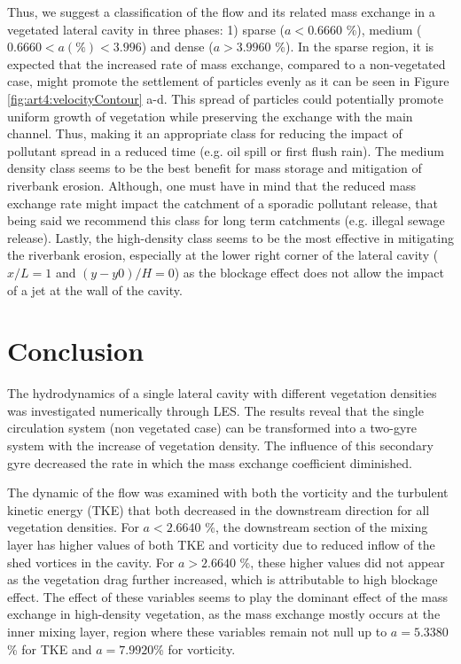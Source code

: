 Thus, we suggest a classification of the flow and its related mass exchange in a vegetated lateral cavity in three phases: 1) sparse ($a<0.6660$ \%), medium ($0.6660<a(\%)<3.996$) and dense ($a>3.9960$ \%). In the sparse region, it is expected that the increased rate of mass exchange, compared to a non-vegetated case, might promote the settlement of particles evenly as it can be seen in Figure \ref{fig:art4:velocityContour} a-d. This spread of particles could potentially promote  uniform growth of vegetation while preserving the exchange with the main channel. Thus, making it an appropriate class for reducing the impact of pollutant spread in a reduced time (e.g. oil spill or first flush rain). The medium density class seems to be the best benefit for mass storage and mitigation of riverbank erosion. Although, one must have in mind that the reduced mass exchange rate might impact the catchment of a sporadic pollutant release, that being said we recommend this class for long term catchments (e.g. illegal sewage release). Lastly, the high-density class seems to be the most effective in mitigating the riverbank erosion, especially at the lower right corner of the lateral cavity ($x/L=1$ and $(y-y0)/H=0$) as the blockage effect does not allow the impact of a jet at the wall of the cavity.

\section{Conclusion}
The hydrodynamics of a single lateral cavity with different vegetation densities was investigated numerically through LES. The results reveal that the single circulation system (non vegetated case) can be transformed into a two-gyre system with the increase of vegetation density. The influence of this secondary gyre decreased the rate in which the mass exchange coefficient diminished.

The dynamic of the flow was examined with both the vorticity and the turbulent kinetic energy (TKE) that both decreased in the downstream direction for all vegetation densities. For $a<2.6640$ \%, the downstream section of the mixing layer has higher values of both TKE and vorticity due to reduced inflow of the shed vortices in the cavity. For $a>2.6640$ \%, these higher values did not appear as the vegetation drag further increased, which is attributable to high blockage effect. The effect of these variables seems to play the dominant effect of the mass exchange in high-density vegetation, as the mass exchange mostly occurs at the inner mixing layer, region where these variables remain not null up to $a=5.3380$ \% for TKE and $a=7.9920$\% for vorticity.

